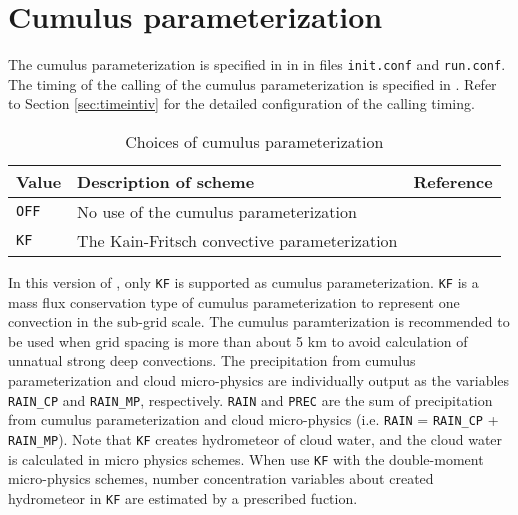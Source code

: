\section{Cumulus parameterization} \label{sec:basic_usel_cumulus}

The cumulus parameterization is specified in  in  in files \verb|init.conf| and \verb|run.conf|. The timing of the calling of the cumulus parameterization is specified in . Refer to Section \ref{sec:timeintiv} for the detailed configuration of the calling timing.

\begin{table}[h]
\begin{center}
  \caption{Choices of cumulus parameterization}
  \label{tab:nml_atm_cp}
  \begin{tabularx}{150mm}{lXX} \hline
    \rowcolor[gray]{0.9}  Value & Description of scheme & Reference\\ \hline
      \verb|OFF|  & No use of the cumulus parameterization &  \\
      \verb|KF|   & The Kain-Fritsch convective parameterization & \citet{kain_1990,kain_2004} \\
    \hline
  \end{tabularx}
\end{center}
\end{table}

In this version of \scalerm, only \verb|KF| is supported as cumulus parameterization. \verb|KF| is a mass flux conservation type of cumulus parameterization to represent one convection in the sub-grid scale.
The cumulus paramterization is recommended to be used when grid spacing is more than about 5 km to avoid calculation of unnatual strong deep convections.
The precipitation from cumulus parameterization and cloud micro-physics are individually output as the variables \verb|RAIN_CP| and \verb|RAIN_MP|, respectively. 
\verb|RAIN| and \verb|PREC| are the sum of precipitation from cumulus parameterization and cloud micro-physics (i.e. \verb|RAIN| = \verb|RAIN_CP| + \verb|RAIN_MP|).
Note that \verb|KF| creates hydrometeor of cloud water, and the cloud water is calculated in micro physics schemes.
When use \verb|KF| with the double-moment micro-physics schemes, number concentration variables about created hydrometeor in \verb|KF| are estimated by a prescribed fuction.


